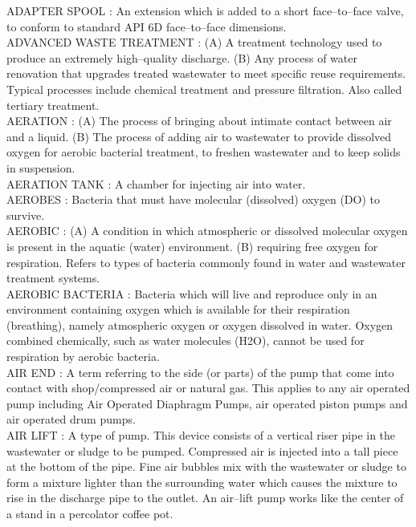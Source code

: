 \vspace{0.15cm}
ADAPTER SPOOL :   An extension which is added to a short face–to–face valve, to conform to standard API 6D face–to–face dimensions.\\
\vspace{0.15cm}
ADVANCED WASTE TREATMENT :  (A) A treatment technology used to produce an extremely high–quality discharge.  (B) Any process of water renovation that upgrades treated wastewater to meet specific reuse requirements. Typical processes include chemical treatment and pressure filtration.  Also called tertiary treatment.\\
\vspace{0.15cm}
AERATION :   (A) The process of bringing about intimate contact between air and a liquid. (B) The process of adding air to wastewater to provide dissolved oxygen for aerobic bacterial treatment, to freshen wastewater and to keep solids in suspension.\\
\vspace{0.15cm}
AERATION TANK :   A chamber for injecting air into water.\\
\vspace{0.15cm}
AEROBES :  Bacteria that must have molecular (dissolved) oxygen (DO) to survive.\\
\vspace{0.15cm}
AEROBIC :  (A) A condition in which atmospheric or dissolved molecular oxygen is present in the aquatic (water) environment.  (B)  requiring free oxygen for respiration. Refers to types of bacteria commonly found in water and wastewater treatment systems.\\
\vspace{0.15cm}
AEROBIC BACTERIA :  Bacteria which will live and reproduce only in an environment containing oxygen which is available for their respiration (breathing), namely atmospheric oxygen or oxygen dissolved in water. Oxygen combined chemically, such as water molecules (H2O), cannot be used for respiration by aerobic bacteria.\\
\vspace{0.15cm}
AIR END :   A term referring to the side (or parts) of the pump that come into contact with shop/compressed air or natural gas. This applies to any air operated pump including Air Operated Diaphragm Pumps, air operated piston pumps and air operated drum pumps.\\
\vspace{0.15cm}
AIR LIFT :  A type of pump. This device consists of a vertical riser pipe in the wastewater or sludge to be pumped. Compressed air is injected into a tall piece at the bottom of the pipe.   Fine air bubbles mix with the wastewater or sludge to form a mixture lighter than the surrounding water which causes the mixture to rise in the discharge pipe to the outlet. An air–lift pump works like the center of a stand in a percolator coffee pot.\\

